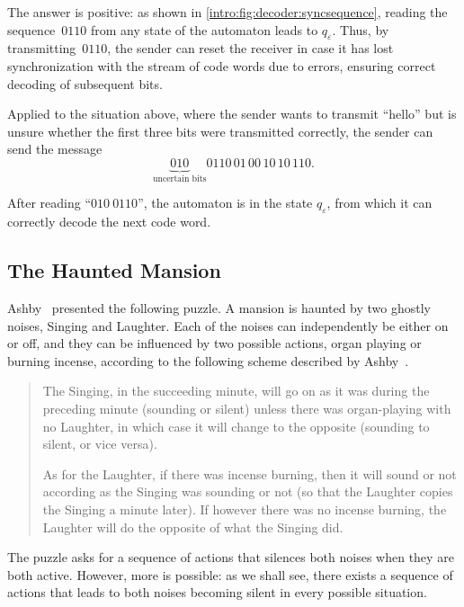 The answer is positive: as shown in \cref{intro:fig:decoder:syncsequence},
reading the sequence~$0110$ from any state of the automaton leads to $q_{\varepsilon}$.
Thus, by transmitting~$0110$, the sender can reset the receiver in case it has lost synchronization 
with the stream of code words due to errors, ensuring correct decoding of subsequent bits.

Applied to the situation above, where the sender wants to transmit ``hello'' but is unsure
whether the first three bits were transmitted correctly, the sender can send the message
\[
\underbrace{010}_{\text{uncertain bits}}
0110\,01\,00\,10\,10\,110.
\]

After reading “$010\ 0110$”,
the automaton is in the state $q_{\varepsilon}$, from which it can correctly decode the
next code word.

\subsection{The Haunted Mansion} 
\label{intro:sec:examples:puzzle}
	
Ashby~\cite{ashby_56} presented the following puzzle. A mansion is haunted
by two ghostly noises, Singing and Laughter. 
Each of the noises can independently be either on or off, and they can be influenced
by two possible actions, organ playing or burning incense, according
to the following scheme described by Ashby~\cite[pp.~60--61]{ashby_56}.

\begin{quote} 
The Singing, in the succeeding minute, will go on as it was during the preceding minute (sounding
or silent) unless there was organ-playing with no Laughter, in which case it will change to the opposite (sounding
to silent, or vice versa).

As for the Laughter, if there was incense burning, then it will sound or not according as the Singing was sounding
or not (so that the Laughter copies the Singing a minute later).
If however there was no incense burning, the Laughter will do the opposite of what the Singing did. 
\end{quote} 

The puzzle asks for a sequence of actions that silences both noises when they are both active. However, more is possible: as we shall see, there exists a sequence of actions that leads to both noises becoming silent in every possible situation.

